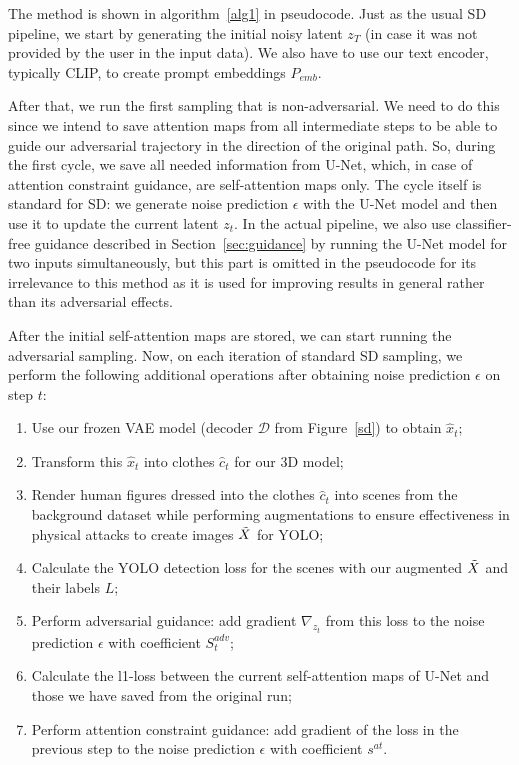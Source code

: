 The method is shown in algorithm~\ref{alg1} in pseudocode. 
Just as the usual SD pipeline, we start by generating the initial noisy latent $z_T$ (in case it was not provided by the user in the input data).
We also have to use our text encoder, typically CLIP, to create prompt embeddings $P_{emb}$.

After that, we run the first sampling that is non-adversarial.
We need to do this since we intend to save attention maps from all intermediate steps to be able to guide our adversarial trajectory in the direction of the original path.
So, during the first cycle, we save all needed information from U-Net, which, in case of attention constraint guidance, are self-attention maps only.
The cycle itself is standard for SD: we generate noise prediction $\epsilon$ with the U-Net model and then use it to update the current latent $z_t$. 
In the actual pipeline, we also use classifier-free guidance described in Section~\ref{sec:guidance} by running the U-Net model for two inputs simultaneously, but this part is omitted in the pseudocode for its irrelevance to this method as it is used for improving results in general rather than its adversarial effects.

After the initial self-attention maps are stored, we can start running the adversarial sampling.
Now, on each iteration of standard SD sampling, we perform the following additional operations after obtaining noise prediction $\epsilon$ on step $t$:

\begin{enumerate}
    \item Use our frozen VAE model (decoder $\mathcal{D}$ from Figure~\ref{sd}) to obtain $\hat x_t$;
    \item Transform this $\hat x_t$ into clothes $\hat c_t$ for our 3D model;
    \item Render human figures dressed into the clothes $\hat c_t$ into scenes from the background dataset while performing augmentations to ensure effectiveness in physical attacks to create images $\Tilde{X}$ for YOLO;
    \item Calculate the YOLO detection loss for the scenes with our augmented $\Tilde{X}$ and their labels $L$;
    \item Perform adversarial guidance: add gradient $\nabla_{z_t}$ from this loss to the noise prediction $\epsilon$ with coefficient $S^{adv}_t$;
    \item Calculate the l1-loss between the current self-attention maps of U-Net and those we have saved from the original run;
    \item Perform attention constraint guidance: add gradient of the loss in the previous step to the noise prediction $\epsilon$ with coefficient $s^{at}$.
\end{enumerate}

